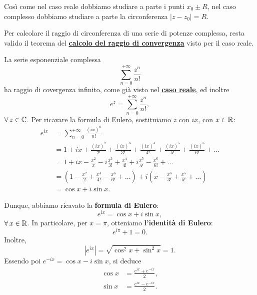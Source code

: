 \documentclass[../../analisi2]{subfiles}
\begin{document}
        \begin{osservazione}
            Così come nel caso reale dobbiamo studiare a parte i punti \(x_0 \pm R\), nel caso complesso dobbiamo studiare a parte la
            circonferenza \(|z - z_0| = R\).
        \end{osservazione}
        \begin{osservazione}
            Per calcolare il raggio di circonferenza di una serie di potenze complessa, resta valido il teorema del
            \hyperref[thr:calcoloRaggioConvergenzaR]{\textbf{calcolo del raggio di convergenza}} visto per il caso reale.
        \end{osservazione}

        \newpage

        \begin{definizione}
            La serie esponenziale complessa
            \[
                \sum_{n = 0}^{+\infty} \frac{z^n}{n!}
            \]
            ha raggio di covergenza infinito, come già visto nel \hyperref[def:serieEsponenziale]{\textbf{caso reale}}, ed inoltre
            \[
                e^z = \sum_{n = 0}^{+\infty} \frac{z^n}{n!},
            \]
            \(\forall \, z \in \mathbb{C}\). Per ricavare la formula di Eulero, sostituiamo \(z\) con \(ix\), con \(x \in \mathbb{R}\):
            \begin{align*}
                e^{ix} &= \sum_{n = 0}^{+\infty} \frac{(ix)^n}{n!}\\
                &= 1 + ix + \frac{(ix)^2}{2!} + \frac{(ix)^3}{3!} + \frac{(ix)^4}{4!} + \frac{(ix)^5}{5!} + \frac{(ix)^6}{6!} + \ldots\\
                &= 1 + ix - \frac{x^2}{x} - i \frac{x^3}{3!} + \frac{x^4}{4!} + i \frac{x^5}{5!} - \frac{x^6}{6!} + \ldots\\
                &= \left(1 - \frac{x^2}{2} + \frac{x^4}{4!} - \frac{x^6}{6!} + \ldots\right) + i \left(x - \frac{x^3}{3!} + \frac{x^5}{5!} + \ldots\right)\\
                &= \cos x + i \sin x.
            \end{align*}

            Dunque, abbiamo ricavato la \textbf{formula di Eulero}:
            \[
                e^{ix} = \cos x + i \sin x,
            \]
            \(\forall \, x \in \mathbb{R}\). In particolare, per \(x = \pi\), otteniamo \textbf{l'identità di Eulero}:
            \[
                e^{i \pi} + 1 = 0.
            \]
            Inoltre,
            \[
                \left|e^{ix}\right| = \sqrt{\cos^2 x + \sin^2 x} = 1.
            \]
            Essendo poi \(e^{-ix} = \cos x - i \sin x\), si deduce
            \begin{align*}
                \cos x &= \frac{e^{ix} + e^{-ix}}{2},\\
                \sin x &= \frac{e^{ix} - e^{-ix}}{2}.
            \end{align*}
        \end{definizione}
\end{document}
